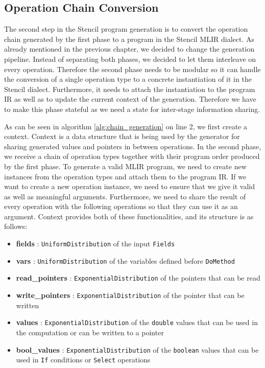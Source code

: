\documentclass[sigplan,\review anonymous]{acmart}
\begin{document}
\subsection{Operation Chain Conversion}
The second step in the Stencil program generation is to convert the operation
chain generated by the first phase to a program in the Stencil MLIR dialect.
As already mentioned in the previous chapter, we decided to change the
generation pipeline. Instead of separating both phases, we decided to let them
interleave on every operation. Therefore the second phase needs to be modular
so it can handle the conversion of a single operation type to a concrete
instantiation of it in the  Stencil dialect. Furthermore, it needs to attach
the instantiation to the program IR as well as to update the current context
of the generation. Therefore we have to make this phase stateful as we need a
state for inter-stage information sharing.

As can be seen in algorithm \ref{alg:chain_generation} on line 2, we first
create a context. Context is a data structure that is being used by the
generator for sharing generated values and pointers in between operations.
In the second phase, we receive a chain of operation types together with their
program order produced by the first phase. To generate a valid MLIR program,
we need to create new instances from the operation types and attach them to
the program IR. If we want to create a new operation instance, we need to
ensure that we give it valid as well as meaningful arguments. Furthermore,
we need to share the result of every operation with the following operations
so that they can use it as an argument. Context provides both of these
functionalities, and its structure is as follows:

\begin{itemize}
  \item \textbf{fields} : \texttt{UniformDistribution} of the input 
    \texttt{Fields}
  \item \textbf{vars} : \texttt{UniformDistribution} of the variables 
    defined before \texttt{DoMethod}
  \item \textbf{read\_pointers} : \texttt{ExponentialDistribution} of the
    pointers that can be read
  \item \textbf{write\_pointers} : \texttt{ExponentialDistribution} of the
    pointer that can be written
  \item \textbf{values} : \texttt{ExponentialDistribution} of the
  \texttt{double} values that can be used in the computation or
  can be written to a pointer
  \item \textbf{bool\_values} : \texttt{ExponentialDistribution} of the
  \texttt{boolean} values that can be used in \texttt{If} conditions 
  or \texttt{Select} operations
\end{itemize}
\end{document}
